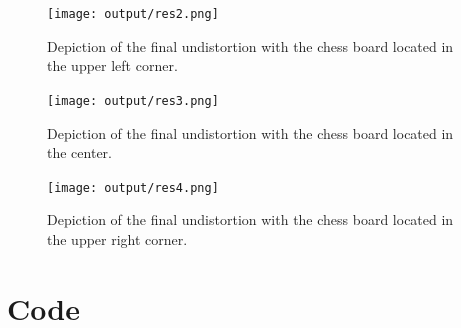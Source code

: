 \documentclass[twocolumn,10pt]{asme2ej}
\begin{document}
\begin{figure}[H]
    \onecolumn\centerline{\texttt{[image: output/res2.png]}}
    \caption{Depiction of the final undistortion with the chess board located in the upper left corner.}
    \label{fig:res2}
\end{figure}

\begin{figure}[H]
    \onecolumn\centerline{\texttt{[image: output/res3.png]}}
    \caption{Depiction of the final undistortion with the chess board located in the center.}
    \label{fig:res3}
\end{figure}

\begin{figure}[H]
    \onecolumn\centerline{\texttt{[image: output/res4.png]}}
    \caption{Depiction of the final undistortion with the chess board located in the upper right corner.}
    \label{fig:res4}
\end{figure}
\twocolumn
\onecolumn
\section{Code}

\onecolumn
% 



\end{document}

